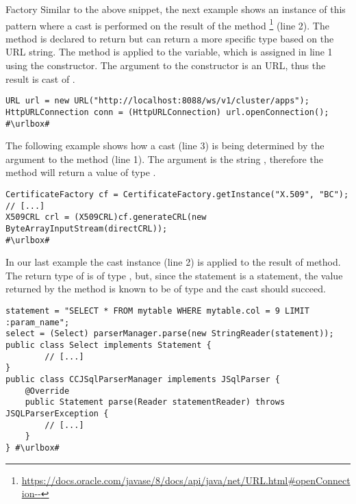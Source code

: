 \begin{pattern}{Factory}
Similar to the above snippet,
the next example shows an instance of this pattern where a cast is performed on the result of the  method%
\footnote{\url{https://docs.oracle.com/javase/8/docs/api/java/net/URL.html\#openConnection--}}
(line 2).
The method is declared to return  but can return a more specific type based on the URL string.
The  method is applied to the  variable,
which is assigned in line 1 using the  constructor.
The argument to the constructor is an  URL,
thus the result is cast of .
\def\urlvar{http://bit.ly/apache_hadoop_2E6KY6T}
\begin{verbatim}
URL url = new URL("http://localhost:8088/ws/v1/cluster/apps");
HttpURLConnection conn = (HttpURLConnection) url.openConnection();
#\urlbox#
\end{verbatim}

The following example shows how a cast (line 3) is being determined by the argument to the  method (line 1).
The argument is the string ,
therefore the method  will return a value of type .

\def\urlvar{http://bit.ly/bcgit_bc_java_2TEVScM}
\begin{verbatim}
CertificateFactory cf = CertificateFactory.getInstance("X.509", "BC");
// [...]
X509CRL crl = (X509CRL)cf.generateCRL(new ByteArrayInputStream(directCRL));
#\urlbox#
\end{verbatim}

In our last example the cast instance (line 2) is applied to the result of  method.
The return type of  is of type , but,
since the statement is a  statement,
the value returned by the  method is known to be of type 
and the cast should succeed.
\def\urlvar{http://bit.ly/JSQLParser_JSqlParser_2TecMyB}
\begin{verbatim}
statement = "SELECT * FROM mytable WHERE mytable.col = 9 LIMIT :param_name";
select = (Select) parserManager.parse(new StringReader(statement));
public class Select implements Statement {
        // [...]
}
public class CCJSqlParserManager implements JSqlParser {
    @Override
    public Statement parse(Reader statementReader) throws JSQLParserException {
        // [...]
    }
} #\urlbox#
\end{verbatim}


\end{pattern}

